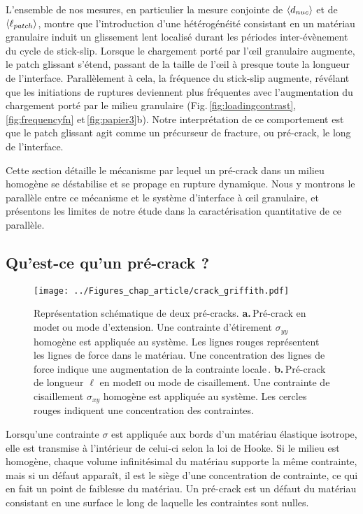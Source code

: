 L'ensemble de nos mesures, en particulier la mesure conjointe de $\left\langle {d_{nuc}} \right\rangle$ et de $\left\langle {\ell_{patch}} \right\rangle$, montre que l'introduction d'une hétérogénéité consistant en un matériau granulaire induit un glissement lent localisé durant les périodes inter-évènement du cycle de stick-slip. Lorsque le chargement porté par l'œil granulaire augmente, le patch glissant s'étend, passant de la taille de l'œil à presque toute la longueur de l'interface. Parallèlement à cela, la fréquence du stick-slip augmente, révélant que les initiations de ruptures deviennent plus fréquentes avec l'augmentation du chargement porté par le milieu granulaire (Fig.\,\ref{fig:loadingcontrast},\,\ref{fig:frequencyfn} et\,\ref{fig:papier3}b). Notre interprétation de ce comportement est que le patch glissant agit comme un précurseur de fracture, ou pré-crack, le long de l'interface.

Cette section détaille le mécanisme par lequel un pré-crack dans un milieu homogène se déstabilise et se propage en rupture dynamique. Nous y montrons le parallèle entre ce mécanisme et le système d'interface à œil granulaire, et présentons les limites de notre étude dans la caractérisation quantitative de ce parallèle.



\subsection{Qu'est-ce qu'un pré-crack ?}


\begin{figure}[h]
\centering
\texttt{[image: ../Figures\_chap\_article/crack\_griffith.pdf]}
\caption[Accumulation des contraintes en pointe de fissure]{Représentation schématique de deux pré-cracks. \textbf{a.}\,Pré-crack en mode\:\textsc{i} ou mode d'extension. Une contrainte d'étirement $\sigma_{yy}$ homogène est appliquée au système. Les lignes rouges représentent les lignes de force dans le matériau. Une concentration des lignes de force indique une augmentation de la contrainte locale\,\cite{ohring_engineering_1995}. \textbf{b.}\,Pré-crack de longueur $\ell$ en mode\:\textsc{ii} ou mode de cisaillement. Une contrainte de cisaillement $\sigma_{xy}$ homogène est appliquée au système. Les cercles rouges indiquent une concentration des contraintes.}
\label{fig:griffith}
\end{figure}


Lorsqu'une contrainte $\sigma$ est appliquée aux bords d'un matériau élastique isotrope, elle est transmise à l'intérieur de celui-ci selon la loi de Hooke. Si le milieu est homogène, chaque volume infinitésimal du matériau supporte la même contrainte, mais si un défaut apparaît, il est le siège d'une concentration de contrainte, ce qui en fait un point de faiblesse du matériau. Un pré-crack est un défaut du matériau consistant en une surface le long de laquelle les contraintes sont nulles.

